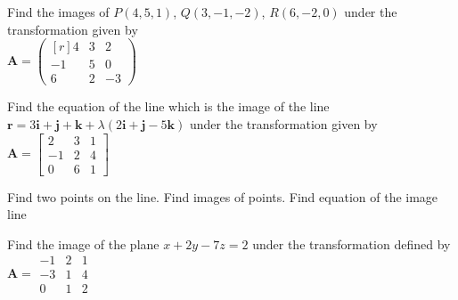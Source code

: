 \begin{example}
	Find the images of $P(4,5,1)$, $Q(3,-1,-2)$, $R(6,-2,0)$ under the transformation given by \\$\mathbf A = \left(\begin{smallmatrix*}[r]4&3&2\\-1&5&0\\6&2&-3\end{smallmatrix*}\right)$
\end{example}
\begin{example}
	Find the equation of the line which is the image of the line $\mathbf r = 3\mathbf i +\mathbf j +\mathbf k + \lambda(2\mathbf i + \mathbf j - 5\mathbf k)$ under the transformation given by $\mathbf A =\begin{bmatrix}2&3&1\\-1&2&4\\0&6&1\end{bmatrix}$
\end{example}
Find two points on the line.
Find images of points.
Find equation of the image line

\begin{example}
	Find the image of the plane $x+2y-7z=2$ under the transformation defined by $\mathbf A = \begin{smallmatrix}-1&2&1\\-3&1&4\\0&1&2\end{smallmatrix}$
\end{example}



